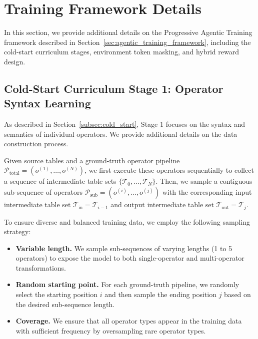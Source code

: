 
\section{Training Framework Details}
\label{sec:appendix_training_details}

In this section, we provide additional details on the Progressive Agentic Training framework described in Section~\ref{sec:agentic_training_framework}, including the cold-start curriculum stages, environment token masking, and hybrid reward design.

\subsection{Cold-Start Curriculum Stage 1: Operator Syntax Learning}
\label{subsec:appendix_stage1}

As described in Section~\ref{subsec:cold_start}, Stage 1 focuses on the syntax and semantics of individual operators. We provide additional details on the data construction process.

Given source tables and a ground-truth operator pipeline $\mathcal{P}_{\text{total}} = (o^{(1)}, \dots, o^{(N)})$, we first execute these operators sequentially to collect a sequence of intermediate table sets $\{\mathcal{T}_{0}, \dots, \mathcal{T}_{N}\}$. Then, we sample a contiguous sub-sequence of operators $\mathcal{P}_{\text{sub}} = (o^{(i)}, \dots, o^{(j)})$ with the corresponding input intermediate table set $\mathcal{T}_{\text{in}}=\mathcal{T}_{i-1}$ and output intermediate table set $\mathcal{T}_{\text{out}}=\mathcal{T}_{j}$.

To ensure diverse and balanced training data, we employ the following sampling strategy:
\begin{itemize}[leftmargin=*]
    \item \textbf{Variable length.} We sample sub-sequences of varying lengths (1 to 5 operators) to expose the model to both single-operator and multi-operator transformations.
    \item \textbf{Random starting point.} For each ground-truth pipeline, we randomly select the starting position $i$ and then sample the ending position $j$ based on the desired sub-sequence length.
    \item \textbf{Coverage.} We ensure that all operator types appear in the training data with sufficient frequency by oversampling rare operator types.
\end{itemize}

